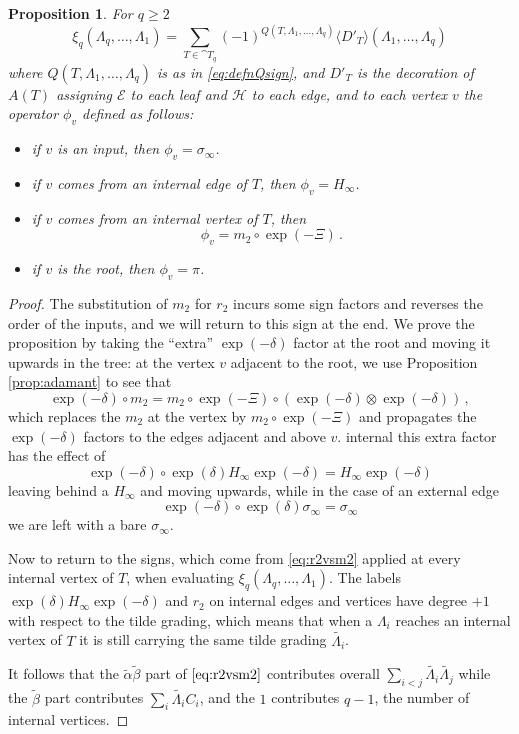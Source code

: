 \documentclass[english,letter paper,12pt,leqno]{article}
\newtheorem{proposition}[theorem]{Proposition}
\theoremstyle{example}
\numberwithin{equation}{section}
\def\be{\begin{equation}}
\def\ee{\end{equation}}
\begin{document}
\begin{proposition} For $q \ge 2$
\be
\xi_q( \Lambda_q, \ldots, \Lambda_1 ) = \sum_{T \in \cat{T}_q} (-1)^{Q(T, \Lambda_1, \ldots, \Lambda_q)} \langle D'_T \rangle( \Lambda_1,\ldots,\Lambda_q)
\ee
where $Q(T, \Lambda_1, \ldots, \Lambda_q)$ is as in \eqref{eq:defnQsign}, and $D'_T$ is the decoration of $A(T)$ assigning $\mathscr{E}$ to each leaf and $\mathscr{H}$ to each edge, and to each vertex $v$ the operator $\phi_v$ defined as follows:
\begin{itemize}
\item if $v$ is an input, then $\phi_v = \sigma_\infty$.
\item if $v$ comes from an internal edge of $T$, then $\phi_v = H_\infty$.
\item if $v$ comes from an internal vertex of $T$, then
\[
\phi_v = m_2 \circ \exp(- \Xi)\,.
\]
\item if $v$ is the root, then $\phi_v = \pi$.
\end{itemize}
\end{proposition}
\begin{proof}
The substitution of $m_2$ for $r_2$ incurs some sign factors and reverses the order of the inputs, and we will return to this sign at the end. We prove the proposition by taking the ``extra'' $\exp(-\delta)$ factor at the root and moving it upwards in the tree: at the vertex $v$ adjacent to the root, we use Proposition \ref{prop:adamant} to see that
\[
\exp(-\delta) \circ m_2 = m_2 \circ \exp(-\Xi) \circ (\exp(-\delta) \otimes \exp(-\delta))\,,
\]
which replaces the $m_2$ at the vertex by $m_2 \circ \exp(-\Xi)$ and propagates the $\exp(-\delta)$ factors to the edges adjacent and above $v$.  internal this extra factor has the effect of
\[
\exp(-\delta) \circ \exp(\delta) H_\infty \exp(-\delta) = H_\infty \exp(-\delta)
\] 
leaving behind a $H_\infty$ and moving upwards, while in the case of an external edge
\[
\exp(-\delta) \circ \exp(\delta) \sigma_\infty = \sigma_\infty
\]
we are left with a bare $\sigma_\infty$.

Now to return to the signs, which come from \eqref{eq:r2vsm2} applied at every internal vertex of $T$, when evaluating $\xi_q( \Lambda_q, \ldots, \Lambda_1 )$. The labels $\exp(\delta) H_\infty \exp(-\delta)$ and $r_2$ on internal edges and vertices have degree $+1$ with respect to the tilde grading, which means that when a $\Lambda_i$ reaches an internal vertex of $T$ it is still carrying the same tilde grading $\widetilde{\Lambda_i}$.

It follows that the $\widetilde{\alpha}\widetilde{\beta}$ part of $\eqref{eq:r2vsm2}$ contributes overall $\sum_{i < j} \widetilde{\Lambda_i} \widetilde{\Lambda_j}$ while the $\widetilde{\beta}$ part contributes $\sum_i \widetilde{\Lambda_i} C_i$, and the $1$ contributes $q - 1$, the number of internal vertices.
\end{proof}
\end{document}
